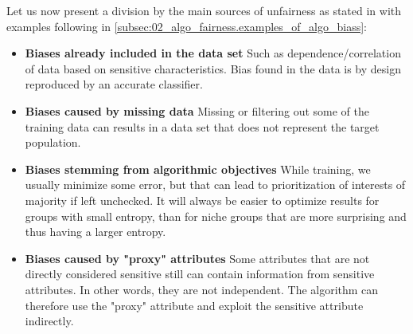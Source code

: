 Let us now present a division by the main sources of unfairness as stated in \cite{pessach2020algorithmic_fairness} with examples following in \ref{subsec:02_algo_fairness.examples_of_algo_biass}:
\begin{itemize}
    \item \textbf{Biases already included in the data set}\newline
    Such as dependence/correlation of data based on sensitive characteristics. Bias found in the data is by design reproduced by an accurate classifier.
    \item \textbf{Biases caused by missing data}\newline
    Missing or filtering out some of the training data can results in a data set that does not represent the target population.
    \item \textbf{Biases stemming from algorithmic objectives}\newline
    While training, we usually minimize some error, but that can lead to prioritization of interests of majority if left unchecked. It will always be easier to optimize results for groups with small entropy, than for niche groups that are more surprising and thus having a larger entropy.
    \item \textbf{Biases caused by "proxy" attributes}\newline
    Some attributes that are not directly considered sensitive still can contain information from sensitive attributes. In other words, they are not independent. The algorithm can therefore use the "proxy" attribute and exploit the sensitive attribute indirectly.
\end{itemize}



